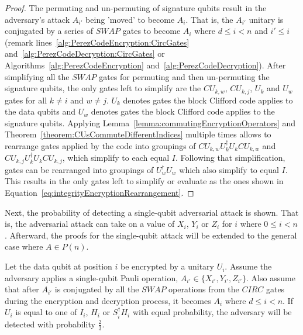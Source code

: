 \begin{proof}
The permuting and un-permuting of signature qubits result in the adversary's attack $A_{i'}$ being 'moved' to become $A_i$. That is, the $A_{i'}$ unitary is conjugated by a series of $\mathit{SWAP}$ gates to become $A_{i}$ where $d \leq i < n$ and $i' \leq i$ (remark lines~\ref{alg:PerezCodeEncryption:CircGates} and~\ref{alg:PerezCodeDecryption:CircGates} or Algorithms~\ref{alg:PerezCodeEncryption} and~\ref{alg:PerezCodeDecryption}). After simplifying all the $\mathit{SWAP}$ gates for permuting and then un-permuting the signature qubits, the only gates left to simplify are the $\mathit{CU}_{k,w}$, $\mathit{CU}_{k,j}$, $U_k$ and $U_w$ gates for all $k \neq i$ and $w \neq j$. $U_k$ denotes gates the block Clifford code applies to the data qubits and $U_w$ denotes gates the block Clifford code applies to the signature qubits. Applying Lemma~\ref{lemma:commutingEncryptionOperators} and Theorem~\ref{theorem:CUsCommuteDifferentIndices} multiple times allows to rearrange gates applied by the code into groupings of  $\mathit{CU}_{k,w}U_k^{\dagger}U_k\mathit{CU}_{k,w}$ and $\mathit{CU}_{k,j}U_k^{\dagger}U_k\mathit{CU}_{k,j}$, which simplify to each equal $I$. Following that simplification, gates can be rearranged into groupings of $U_w^{\dagger}U_w$ which also simplify to equal $I$. This results in the only gates left to simplify or evaluate as the ones shown in Equation~\eqref{eq:integrityEncryptionRearrangement}.
\end{proof}
Next, the probability of detecting a single-qubit adversarial attack is shown. That is, the adversarial attack can take on a value of $X_i$, $Y_i$ or $Z_i$ for $i$ where $0 \leq i < n$. Afterward, the proofs for the single-qubit attack will be extended to the general case where $A \in P(n)$.
\begin{theorem}
\label{theorem:singleQubitAttackOnDataQubit}
Let the data qubit at position $i$ be encrypted by a unitary $U_i$. Assume the adversary applies a single-qubit Pauli operation, $A_{i'} \in \{X_{i'}, Y_{i'}, Z_{i'}\}$. Also assume that after $A_{i'}$ is conjugated by all the $\mathit{SWAP}$ operations from the $\mathit{CIRC}$ gates during the encryption and decryption process, it becomes $A_i$ where $d \leq i < n$. If $U_i$ is equal to one of $I_i$, $H_i$ or $S_i^{\dagger}H_i$ with equal probability, the adversary will be detected with probability $\frac{2}{3}$.
\end{theorem}
